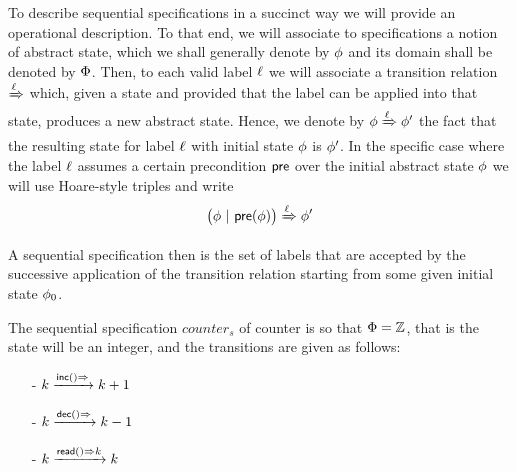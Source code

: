 To describe sequential specifications in a succinct way we will
provide an operational description.
To that end, we will associate to specifications a notion of abstract
state, which we shall generally denote by $\abstate$ and its domain
shall be denoted by $\abstates$.
Then, to each valid label $\alabel$ we will associate a transition
relation \;$\xRightarrow{\alabel}$\; which, given a state and provided
that the label can be applied into that state, produces a new abstract
state.
Hence, we denote by $\abstate \xRightarrow{\alabel}  \abstate'$
the fact that
the resulting state for label $\alabel$ with initial state $\abstate$
is $\abstate'$.
%
In the specific case where the label $\alabel$ assumes a certain
precondition $\apre$ over the initial abstract state $\abstate$ we
will use Hoare-style triples and write
\[ \big(\abstate\ |\ \apre(\abstate)\big) \xRightarrow{\alabel}  \abstate' \]

A sequential specification then is the set of labels that are accepted
by the successive application of the transition relation starting from
some given initial state $\abstate_{0}$.



\begin{example}
\label{definition:sequential specification of counter}
The sequential specification $\mathit{counter}_s$ of counter is so
that $\abstates = \mathbb{Z}$, that is the state will be an integer,
and the transitions are given as follows:
\begin{itemize}
\setlength{\itemsep}{0.5pt}
\item[-] $k \xrightarrow{\alabellong[\mathsf{inc}]{}{}} k+1$
\item[-] $k \xrightarrow{\alabellong[\mathsf{dec}]{}{}} k-1$
\item[-] $k \xrightarrow{\alabellong[\mathsf{read}]{}{k}} k$
\end{itemize}
\end{example}


